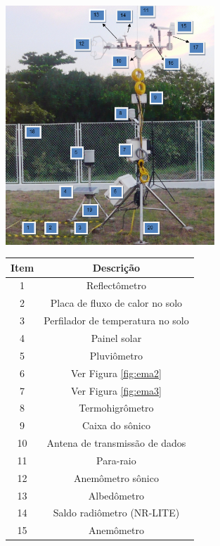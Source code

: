 \begin{figure}
\begin{minipage}{\textwidth}
  \begin{minipage}[b]{0.59\textwidth}
    \centering
    	\includegraphics[width=0.7\textwidth]{./img/ema5.png}
  \end{minipage}
  \hfill
  \begin{minipage}[b]{0.39\textwidth}
    \centering
		\begin{footnotesize}
		\begin{tabular}{cc}
		\toprule
		Item & Descrição\\
		\midrule
		1 & Reflectômetro \\
		2 & Placa de fluxo de calor no solo\\
		3 & Perfilador de temperatura no solo\\
		4 & Painel solar\\
		5 & Pluviômetro \\
		6 & Ver Figura \ref{fig:ema2}\\
		7 & Ver Figura \ref{fig:ema3}\\
		8 & Termohigrômetro\\
		9 & Caixa do sônico\\
		10 & Antena de transmissão de dados\\
		11 & Para-raio\\
		12 & Anemômetro sônico\\
		13 & Albedômetro \\
		14 & Saldo radiômetro (NR-LITE)\\
		15 & Anemômetro\\

\end{tabular}
\end{footnotesize}
\end{minipage}
\end{minipage}
\end{figure}
